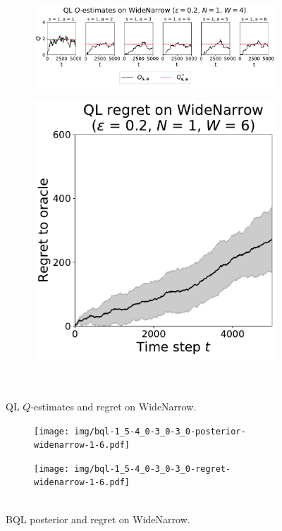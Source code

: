\documentclass{article}
\begin{document}
\begin{appendices}
\begin{figure}[h!]
\centering
\begin{subfigure}{0.65\textwidth}
\includegraphics[width=\linewidth]{img/ql-0_2-qestimates-widenarrow-1-6.pdf}
\end{subfigure}
\begin{subfigure}{0.34\textwidth}
\includegraphics[width=\linewidth]{img/ql-0_2-regret-widenarrow-1-6.pdf}~\\~\\
\end{subfigure}
\captionsetup{width=0.9\linewidth}
\caption{QL $Q$-estimates and regret on WideNarrow.}\label{ql_widenarrow_visual}
\end{figure}

\begin{figure}[h!]
\centering
\begin{subfigure}{0.65\textwidth}
\texttt{[image: img/bql-1\_5-4\_0-3\_0-3\_0-posterior-widenarrow-1-6.pdf]}
\end{subfigure}
\begin{subfigure}{0.34\textwidth}
\texttt{[image: img/bql-1\_5-4\_0-3\_0-3\_0-regret-widenarrow-1-6.pdf]}~\\~\\
\end{subfigure}
\captionsetup{width=0.9\linewidth}
\caption{BQL posterior and regret on WideNarrow.}\label{bql_widenarrow_visual}
\end{figure}


\end{appendices}
\end{document}
